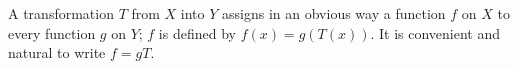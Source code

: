 A transformation $T$ from $X$ into $Y$ assigns in an obvious way a function $f$ on $X$ to every function $g$ on $Y$; $f$ is defined by $f(x) = g(T(x))$. It is convenient and natural to write $f = gT$.
